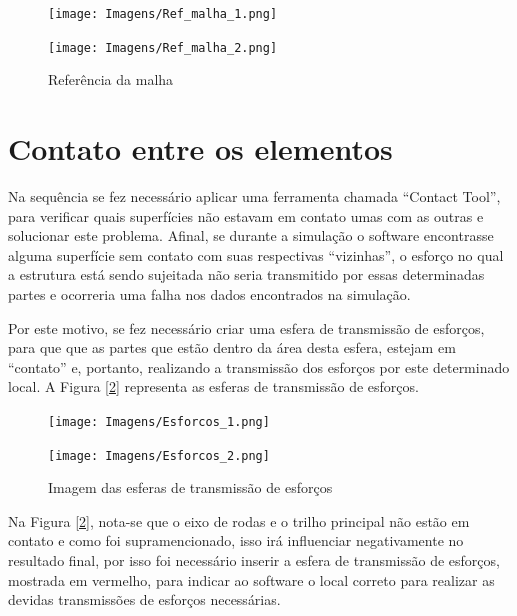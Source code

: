 \documentclass[deposito, acronym, symbols]{fei}
\begin{document}
\begin{figure}[!htp]
  \centering
  \begin{minipage}{0.7\textwidth}
        \caption{Referência da malha}
        \texttt{[image: Imagens/Ref\_malha\_1.png]}
        \label{fig: Referencia de malha 1}
  \end{minipage}
  \hfill
  \begin{minipage}{0.6\textwidth}
        \texttt{[image: Imagens/Ref\_malha\_2.png]}
  \end{minipage}
\end{figure}

\newpage

\section{Contato entre os elementos}

Na sequência se fez necessário aplicar uma ferramenta chamada “Contact Tool”, para verificar quais superfícies não estavam em contato umas com as outras e solucionar este problema. Afinal, se durante a simulação o software encontrasse alguma superfície sem contato com suas respectivas “vizinhas”, o esforço no qual a estrutura está sendo sujeitada não seria transmitido por essas determinadas partes e ocorreria uma falha nos dados encontrados na simulação. 

Por este motivo, se fez necessário criar uma esfera de transmissão de esforços, para que que as partes que estão dentro da área desta esfera, estejam em “contato” e, portanto, realizando a transmissão dos esforços por este determinado local. A Figura [\ref{fig: Esforcos_1}] representa as esferas de transmissão de esforços.


\begin{figure}[!htp]
  \centering
  \begin{minipage}{0.7\textwidth}
        \caption{Imagem das esferas de transmissão de esforços}
        \texttt{[image: Imagens/Esforcos\_1.png]}
        \label{fig: Esforcos_1}
  \end{minipage}
  \hfill
  \begin{minipage}{0.6\textwidth}
        \texttt{[image: Imagens/Esforcos\_2.png]}
  \end{minipage}
\end{figure}

\newpage
Na Figura  [\ref{fig: Esforcos_1}], nota-se que o eixo de rodas e o trilho principal não estão em contato e como foi supramencionado, isso irá influenciar negativamente no resultado final, por isso foi necessário inserir a esfera de transmissão de esforços, mostrada em vermelho, para indicar ao software o local correto para realizar as devidas transmissões de esforços necessárias.
\end{document}
